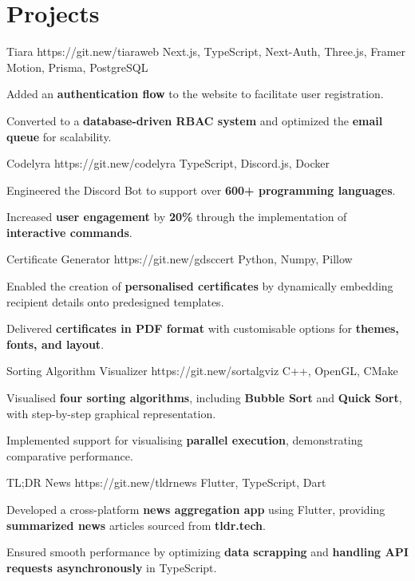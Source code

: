 \section*{Projects}

\project
  {Tiara}
  {https://git.new/tiaraweb}
  {Next.js, TypeScript, Next-Auth, Three.js, Framer Motion, Prisma, PostgreSQL}
  {
    \item Added an \textbf{authentication flow} to the website to facilitate user registration.
    \item Converted to a \textbf{database-driven RBAC system} and optimized the \textbf{email queue} for scalability.
  }

\project
  {Codelyra}
  {https://git.new/codelyra}
  {TypeScript, Discord.js, Docker}
  {
    \item Engineered the Discord Bot to support over \textbf{600+ programming languages}.
    \item Increased \textbf{user engagement} by \textbf{20\%} through the implementation of \textbf{interactive commands}.
  }

\project
  {Certificate Generator}
  {https://git.new/gdsccert}
  {Python, Numpy, Pillow}
  {
    \item Enabled the creation of \textbf{personalised certificates} by dynamically embedding recipient details onto predesigned templates.
    \item Delivered \textbf{certificates in PDF format} with customisable options for \textbf{themes, fonts, and layout}.
  }

\project
  {Sorting Algorithm Visualizer}
  {https://git.new/sortalgviz}
  {C++, OpenGL, CMake}
  {
    \item Visualised \textbf{four sorting algorithms}, including \textbf{Bubble Sort} and \textbf{Quick Sort}, with step-by-step graphical representation.
    \item Implemented support for visualising \textbf{parallel execution}, demonstrating comparative performance.
  }

\project
  {TL;DR News}
  {https://git.new/tldrnews}
  {Flutter, TypeScript, Dart}
  {
    \item Developed a cross-platform \textbf{news aggregation app} using Flutter, providing \textbf{summarized news} articles sourced from \textbf{tldr.tech}.
    \item Ensured smooth performance by optimizing \textbf{data scrapping} and \textbf{handling API requests asynchronously} in TypeScript.
  }
